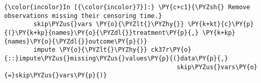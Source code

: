    \begin{Verbatim}[commandchars=\\\{\}]
{\color{incolor}In [{\color{incolor}7}]:} \PY{c+c1}{\PYZsh{} Remove observations missing their censoring time.}
        skip\PYZus{}vars \PY{o}{\PYZlt{}\PYZhy{}} \PY{k+kt}{c}\PY{p}{(}\PY{k+kp}{names}\PY{o}{\PYZdl{}}treatment\PY{p}{,} \PY{k+kp}{names}\PY{o}{\PYZdl{}}outcome\PY{p}{)}
        impute \PY{o}{\PYZlt{}\PYZhy{}} ck37r\PY{o}{::}impute\PYZus{}missing\PYZus{}values\PY{p}{(}data\PY{p}{,}
                                               skip\PYZus{}vars\PY{o}{=}skip\PYZus{}vars\PY{p}{)}
\end{Verbatim}
